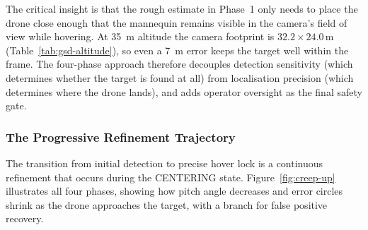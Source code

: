 \noindent The critical insight is that the rough estimate in Phase~1 only needs to place the drone close enough that the mannequin remains visible in the camera's field of view while hovering.  At \SI{35}{\metre} altitude the camera footprint is $32.2 \times 24.0$\,m (Table~\ref{tab:gsd-altitude}), so even a \SI{7}{\metre} error keeps the target well within the frame.  The four-phase approach therefore decouples detection sensitivity (which determines whether the target is found at all) from localisation precision (which determines where the drone lands), and adds operator oversight as the final safety gate.

\subsubsection{The Progressive Refinement Trajectory}\label{sec:creep-up}

The transition from initial detection to precise hover lock is a continuous refinement that occurs during the CENTERING state.  Figure~\ref{fig:creep-up} illustrates all four phases, showing how pitch angle decreases and error circles shrink as the drone approaches the target, with a branch for false positive recovery.

